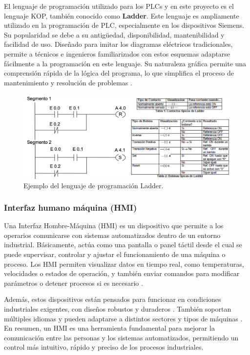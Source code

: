 El lenguaje de programación utilizado para los PLCs y en este proyecto es el lenguaje KOP, también conocido como \textbf{Ladder}. Este lenguaje es ampliamente utilizado en la programación de PLC, especialmente en los dispositivos Siemens. Su popularidad se debe a su antigüedad, disponibilidad, mantenibilidad y facilidad de uso. Diseñado para imitar los diagramas eléctricos tradicionales, permite a técnicos e ingenieros familiarizados con estos esquemas adaptarse fácilmente a la programación en este lenguaje. Su naturaleza gráfica permite una comprensión rápida de la lógica del programa, lo que simplifica el proceso de mantenimiento y resolución de problemas \cite{ladder_info}.

\begin{figure} [h!]
  \begin{center}
    \includegraphics[width=14cm]{figs/ladder}
  \end{center}
  \caption{\centering Ejemplo del lenguaje de programación Ladder.}
  \label{fig:ladder}
\end{figure} 


\subsubsection{Interfaz humano máquina (HMI)}

Una Interfaz Hombre-Máquina (HMI) es un dispositivo que permite a los operarios comunicarse con sistemas automatizados dentro de un entorno industrial. Básicamente, actúa como una pantalla o panel táctil desde el cual se puede supervisar, controlar y ajustar el funcionamiento de una máquina o proceso. Los HMI permiten visualizar datos en tiempo real, como temperaturas, velocidades o estados de operación, y también enviar comandos para modificar parámetros o detener procesos si es necesario \cite{hmi}.

Además, estos dispositivos están pensados para funcionar en condiciones industriales exigentes, con diseños robustos y duraderos \cite{hmi}. También soportan múltiples idiomas y pueden adaptarse a distintos sectores y tipos de máquinas \cite{hmi}. En resumen, un HMI es una herramienta fundamental para mejorar la comunicación entre las personas y los sistemas automatizados, permitiendo un control más intuitivo, rápido y preciso de los procesos industriales.

